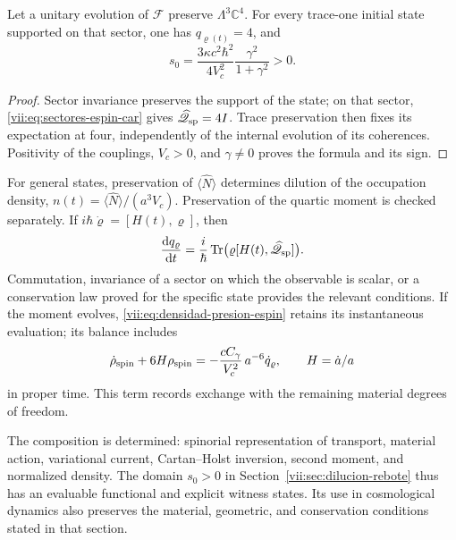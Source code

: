 \begin{corollary}
\label{vii:cor:dominio-positivo-conservado}
Let a unitary evolution of \(\mathcal F\) preserve
\(\Lambda^3\mathbb C^4\). For every trace-one initial state
supported on that sector, one has \(q_{\varrho(t)}=4\), and
\begin{equation}
 s_0=\frac{3\kappa c^2\hbar^2}{4V_c^2}
                   \frac{\gamma^2}{1+\gamma^2}>0.
 \label{vii:eq:amplitud-positiva-sector-tres}
\end{equation}
\end{corollary}
\begin{proof}
Sector invariance preserves the support of the state; on that sector,
\eqref{vii:eq:sectores-espin-car} gives
\(\widehat{\mathscr Q}_{\rm sp}=4I\). Trace preservation
then fixes its expectation at four, independently of the internal
evolution of its coherences. Positivity of the couplings,
\(V_c>0\), and \(\gamma\ne0\) proves the formula
and its sign.
\end{proof}

For general states, preservation of
\(\langle\widehat N\rangle\) determines dilution of the occupation
density, \(n(t)=\langle\widehat N\rangle/(a^3V_c)\).
Preservation of the quartic moment is checked separately.
If \(i\hbar\dot\varrho=[H(t),\varrho]\), then
\begin{equation}
 \frac{\mathrm d q_\varrho}{\mathrm dt}
 =\frac{i}{\hbar}\operatorname{Tr}
       \bigl(\varrho[H(t),\widehat{\mathscr Q}_{\rm sp}]\bigr).
 \label{vii:eq:conservacion-momento-cuartico}
\end{equation}
Commutation, invariance of a sector on which the observable is
scalar, or a conservation law proved for the specific state
provides the relevant conditions. If the moment evolves,
\eqref{vii:eq:densidad-presion-espin} retains its instantaneous
evaluation; its balance includes
\[
 \dot\rho_{\rm spin}+6H\rho_{\rm spin}
 =-\frac{cC_\gamma}{V_c^2}\,a^{-6}\dot q_\varrho,
 \qquad H=\dot a/a
\]
in proper time. This term records exchange with the remaining
material degrees of freedom.

The composition is determined: spinorial representation of
transport, material action, variational current, Cartan--Holst
inversion, second moment, and normalized density. The domain
\(s_0>0\) in Section~\ref{vii:sec:dilucion-rebote} thus has
an evaluable functional and explicit witness states. Its use in
cosmological dynamics also preserves the material, geometric,
and conservation conditions stated in that section.
